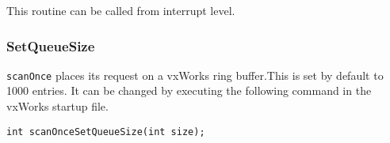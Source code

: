 This routine can be called from interrupt level.

\subsubsection{SetQueueSize}

\verb|scanOnce| places its request on a vxWorks ring buffer.This is set by default to 1000 entries. It can be changed by 
executing the following command in the vxWorks startup file.

\begin{verbatim}int scanOnceSetQueueSize(int size);
\end{verbatim}










